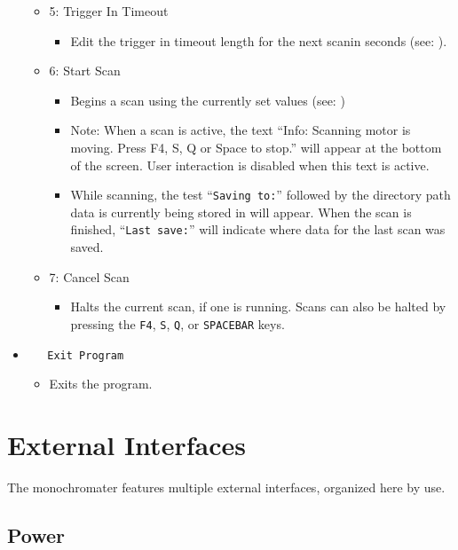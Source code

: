 \documentclass{article}
\begin{document}
\begin{itemize}
\begin{itemize}
\begin{itemize}
        \end{itemize}
        \item 5: Trigger In Timeout
        \begin{itemize}
            \item Edit the trigger in timeout length for the next scanin seconds (see: ).
        \end{itemize}
        \item 6: Start Scan
        \begin{itemize}
            \item Begins a scan using the currently set values (see: )
            \item Note: When a scan is active, the text ``Info: Scanning motor is moving. Press F4, S, Q or Space to stop.'' will appear at the bottom of the screen. User interaction is disabled when this text is active.
            \item While scanning, the test ``\verb|Saving to:|'' followed by the directory path data is currently being stored in will appear. When the scan is finished, ``\verb|Last save:|'' will indicate where data for the last scan was saved.
        \end{itemize}
        \item 7: Cancel Scan
        \begin{itemize}
            \item Halts the current scan, if one is running. Scans can also be halted by pressing the \verb|F4|, \verb|S|, \verb|Q|, or \verb|SPACEBAR| keys.
        \end{itemize}
    \end{itemize}
    \item \verb|   Exit Program|
    \begin{itemize}
        \item Exits the program.
    \end{itemize}
\end{itemize}


\section{External Interfaces} \label{section:externalinterfaces}

The monochromater features multiple external interfaces, organized here by use.

\subsection{Power}
\end{document}
